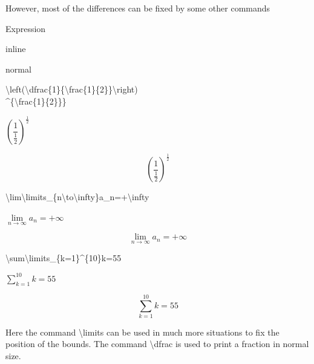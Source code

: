 \documentclass{beamer}
\newcommand{\samplecommand}[1]{\alert{\textbackslash #1}}
\begin{document}
\begin{frame}
	However, most of the differences can be fixed by some other commands
	\begin{example}
		\begin{minipage}{0.48\linewidth}
			\centering Expression
		\end{minipage}
		\begin{minipage}{0.24\linewidth}
			\centering inline
		\end{minipage}
		\begin{minipage}{0.24\linewidth}
			\centering normal
		\end{minipage}
		\vfill
		\begin{minipage}{0.48\linewidth}
			\samplecommand{left(}\samplecommand{dfrac}\{1\}\{\samplecommand{frac}\{1\}\{2\}\}\samplecommand{right)}\\
			\^{}\{\samplecommand{frac}\{1\}\{2\}\}\}
		\end{minipage}
		\begin{minipage}{0.24\linewidth}
			\centering $\left(\dfrac{1}{\frac{1}{2}}\right)^{\frac{1}{2}}$
		\end{minipage}
		\begin{minipage}{0.24\linewidth}
			$$\left(\dfrac{1}{\frac{1}{2}}\right)^{\frac{1}{2}}$$
		\end{minipage}
		\vfill
		\begin{minipage}{0.48\linewidth}
			\samplecommand{lim}\samplecommand{limits}\_\{n\samplecommand{to}\samplecommand{infty}\}a\_n=+\samplecommand{infty}
		\end{minipage}
		\begin{minipage}{0.24\linewidth}
			\centering $\lim\limits_{n\to\infty}a_n=+\infty$
		\end{minipage}
		\begin{minipage}{0.24\linewidth}
			$$\lim\limits_{n\to\infty}a_n=+\infty$$
		\end{minipage}
		\vfill
		\begin{minipage}{0.48\linewidth}
			\samplecommand{sum}\samplecommand{limits}\_\{k=1\}\^{}\{10\}k=55
		\end{minipage}
		\begin{minipage}{0.24\linewidth}
			\centering $\sum\limits_{k=1}^{10}k=55$
		\end{minipage}
		\begin{minipage}{0.24\linewidth}
			$$\sum\limits_{k=1}^{10}k=55$$
		\end{minipage}
	\end{example}
	Here the command \samplecommand{limits} can be used in much more situations to fix the position of the bounds. The command \samplecommand{dfrac} is used to print a fraction in normal size.
\end{frame}
\end{document}
